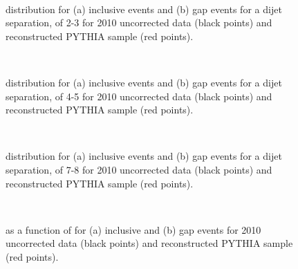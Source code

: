 \begin{figure}
\centering
\mbox{
              \quad
              \quad
                              }
\caption[]{
\dphi{} distribution for (a) inclusive events and (b) gap events for a dijet separation, \dy{} of 2-3 for 2010 uncorrected data (black points) and reconstructed PYTHIA sample (red points).
\label{GBJ2:Uncorr:dphi23}}
\end{figure}


\begin{figure}
\centering
\mbox{
              \quad
              \quad
                              }
\caption[]{
\dphi{} distribution for (a) inclusive events and (b) gap events for a dijet separation, \dy{} of 4-5 for 2010 uncorrected data (black points) and reconstructed PYTHIA sample (red points).
\label{GBJ2:Uncorr:dphi45}}
\end{figure}



\begin{figure}
\centering
\mbox{
              \quad
              \quad
                              }
\caption[]{
\dphi{} distribution for (a) inclusive events and (b) gap events for a dijet separation, \dy{} of 7-8 for 2010 uncorrected data (black points) and reconstructed PYTHIA sample (red points).
\label{GBJ2:Uncorr:dphi78}}
\end{figure}



\begin{figure}
\centering
\mbox{
              \quad
              \quad
                              }
\caption[]{
\mean{\cosdphi{}} as a function of \dy{} for (a) inclusive and (b) gap events for 2010 uncorrected data (black points) and reconstructed PYTHIA sample (red points).
\label{GBJ2:Uncorr:cos}}
\end{figure}


